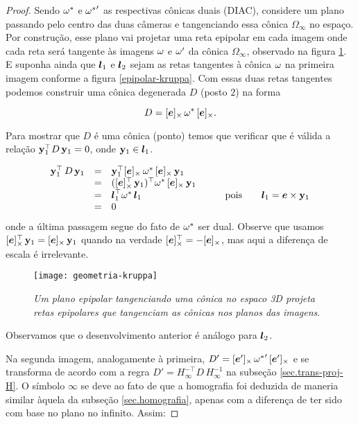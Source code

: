 \begin{proof}
 Sendo ${\bf \omega}^*$ e ${{\bf \omega}^*}'$ as respectivas cônicas duais (DIAC), considere um plano passando pelo centro das duas câmeras e tangenciando essa cônica $\Omega_\infty$ no espaço. Por construção, esse plano vai projetar uma reta epipolar em cada imagem onde cada reta será tangente às imagens ${\bf \omega}$ e ${\bf \omega'}$ da cônica $\Omega_\infty$, observado na figura \ref{geometria-kruppa}. E suponha ainda que $\boldsymbol{l}_1$ e $\boldsymbol{l}_2$ sejam as retas tangentes à cônica ${\bf \omega}$ na primeira imagem conforme a figura \ref{epipolar-kruppa}. Com essas duas retas tangentes podemos construir uma cônica degenerada $D$ (posto $2$) na forma  

\begin{equation}\label{eq.def.con.deg}
D=[\boldsymbol{e}]_\times\,{\bf \omega}^*\,[\boldsymbol{e}]_\times. 
\end{equation}

Para mostrar que $D$ é uma cônica (ponto) temos que verificar que é válida a relação ${\bf y}_1^\top D\,{\bf y}_1=0$, onde ${\bf y}_1\in\boldsymbol{l}_1$.

\begin{equation*}
\begin{array}{rcll}
{\bf y}_1^\top\,D\,{\bf y}_1&=&{\bf y}_1^\top [\boldsymbol{e}]_\times\,{\bf \omega}^*\,[\boldsymbol{e}]_\times\,{\bf y}_1&\\
&=&([\boldsymbol{e}]^\top_\times\,{\bf y}_1)^\top {\bf \omega}^*\,[\boldsymbol{e}]_\times\,{\bf y}_1&\\
&=&\boldsymbol{l}_1^\top {\bf \omega}^*\,\boldsymbol{l}_1& \qquad\text{pois}\qquad\boldsymbol{l}_1=\boldsymbol{e}\times{\bf y}_1\\
&=&0&
\end{array}
\end{equation*}
onde a última passagem segue do fato de ${\bf \omega}^*$ ser dual. Observe que usamos $[\boldsymbol{e}]^\top_\times\,{\bf y}_1=[\boldsymbol{e}]_\times\,{\bf y}_1$ quando na verdade $[\boldsymbol{e}]^\top_\times=-[\boldsymbol{e}]_\times$, mas aqui a diferença de escala é irrelevante. 

\begin{figure}[!htb]
\centering
\texttt{[image: geometria-kruppa]}
\caption{\textit{Um plano epipolar tangenciando uma cônica no espaco 3D projeta retas epipolares que tangenciam as cônicas nos planos das imagens}.}
\label{geometria-kruppa}
\end{figure}

Observamos que o desenvolvimento anterior é análogo para $\boldsymbol{l}_2$.

Na segunda imagem, analogamente à primeira, $D'=[\boldsymbol{e}']_\times\,{{\bf \omega}^*}'\,[\boldsymbol{e}']_\times$ e se transforma de acordo com a regra $D'=H_\infty^{-\top}D\,H_\infty^{-1}$ na subseção \ref{sec.trans-proj-H}. O símbolo $\infty$ se deve ao fato de que a homografia foi deduzida de maneria similar àquela da subseção  \ref{sec.homografia}, apenas com a diferença de ter sido com base no plano no infinito. Assim:


\end{proof}
